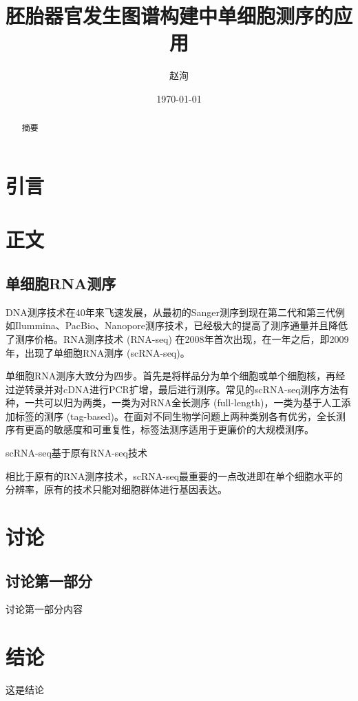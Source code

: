 \documentclass[lang=cn]{elegantpaper}
\title{胚胎器官发生图谱构建中单细胞测序的应用}
\author{赵洵}
\institute{中国科学院大学}
\date{\today}
\begin{document}
\maketitle

\begin{abstract}
摘要
\end{abstract}

\section{引言}

\section{正文}
\subsection{单细胞RNA测序}
DNA测序技术在40年来飞速发展，从最初的Sanger测序到现在第二代和第三代例如Ilummina、PacBio、Nanopore测序技术，已经极大的提高了测序通量并且降低了测序价格\citep{shendure_dna_2017}。RNA测序技术 (RNA-seq) 在2008年首次出现\citep{cloonan_stem_2008}，在一年之后，即2009年，出现了单细胞RNA测序 (scRNA-seq)\citep{tang_mrna-seq_2009}。

单细胞RNA测序大致分为四步。首先是将样品分为单个细胞或单个细胞核，再经过逆转录并对cDNA进行PCR扩增，最后进行测序。常见的scRNA-seq测序方法有种，一共可以归为两类，一类为对RNA全长测序 (full-length)，一类为基于人工添加标签的测序 (tag-based)\citep{hedlund_single-cell_2018}。在面对不同生物学问题上两种类别各有优劣，全长测序有更高的敏感度和可重复性，标签法测序适用于更廉价的大规模测序\citep{ziegenhain_comparative_2017}。

scRNA-seq基于原有RNA-seq技术

相比于原有的RNA测序技术，scRNA-seq最重要的一点改进即在单个细胞水平的分辨率，原有的技术只能对细胞群体进行基因表达。

\section{讨论}
\subsection{讨论第一部分}
    讨论第一部分内容
\section{结论}
这是结论

\end{document}

